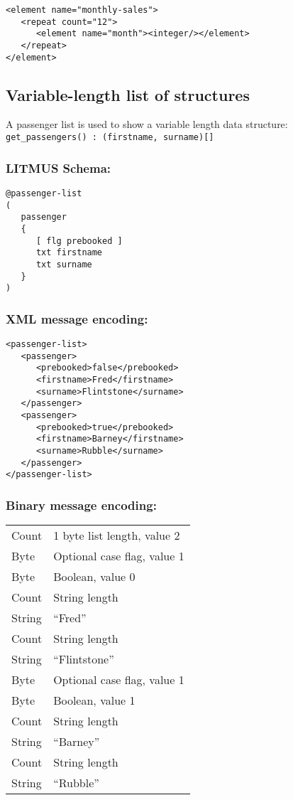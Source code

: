 \documentclass[12pt,a4paper,twoside]{article}
\renewcommand{\_}{\texttt{\symbol{95}}}
\begin{document}
\begin{verbatim}
<element name="monthly-sales">
   <repeat count="12">
      <element name="month"><integer/></element>
   </repeat>
</element>
\end{verbatim}

\subsection{Variable-length list of structures}

A passenger list is used to show a variable length data structure:\\
\verb^get_passengers() : (firstname, surname)[]^

\subsubsection*{LITMUS Schema:}

\begin{verbatim}
@passenger-list
(
   passenger
   {
      [ flg prebooked ]
      txt firstname
      txt surname
   }
)
\end{verbatim}

\subsubsection*{XML message encoding:}

\begin{verbatim}
<passenger-list>
   <passenger>
      <prebooked>false</prebooked>
      <firstname>Fred</firstname>
      <surname>Flintstone</surname>
   </passenger>
   <passenger>
      <prebooked>true</prebooked>
      <firstname>Barney</firstname>
      <surname>Rubble</surname>
   </passenger>
</passenger-list>
\end{verbatim}

\subsubsection*{Binary message encoding:}

\begin{tabular}{ll}
Count & 1 byte list length, value 2\\
Byte & Optional case flag, value 1\\
Byte & Boolean, value 0\\
Count & String length\\
String & ``Fred''\\
Count & String length\\
String & ``Flintstone''\\
Byte & Optional case flag, value 1\\
Byte & Boolean, value 1\\
Count & String length\\
String & ``Barney''\\
Count & String length\\
String & ``Rubble''\\
\end{tabular}
\end{document}
